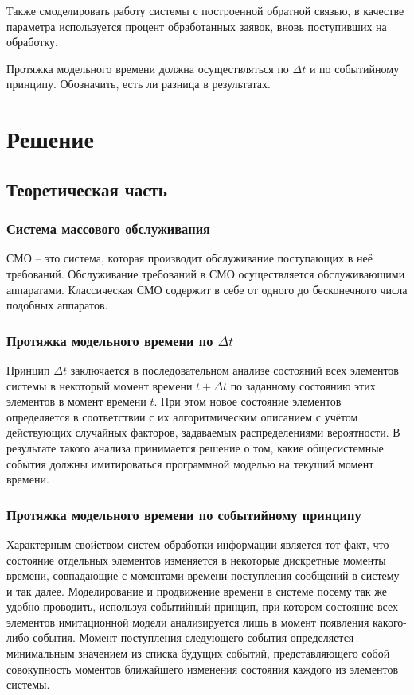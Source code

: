 \documentclass[14pt]{extreport}
\begin{document}
Также смоделировать работу системы с построенной обратной связью, в качестве параметра используется процент обработанных заявок, вновь поступивших на обработку.

Протяжка модельного времени должна осуществляться по $\Delta t$ и по событийному принципу. Обозначить, есть ли разница в результатах. 



\chapter{Решение}
\section{Теоретическая часть}

\subsection{Система массового обслуживания}

СМО -- это система, которая производит обслуживание поступающих в неё требований. Обслуживание требований в СМО осуществляется обслуживающими аппаратами. Классическая СМО содержит в себе от одного до бесконечного числа подобных аппаратов.

\subsection{Протяжка модельного времени по $\Delta t$}

Принцип $\Delta t$ заключается в последовательном анализе состояний всех элементов системы в некоторый момент времени $t + \Delta t$ по заданному состоянию этих элементов в момент времени $t$. При этом новое состояние элементов определяется в соответствии с их алгоритмическим описанием с учётом действующих случайных факторов, задаваемых распределениями вероятности. В результате такого анализа принимается решение о том, какие общесистемные события должны имитироваться программной моделью на текущий момент времени.

\subsection{Протяжка модельного времени по событийному принципу}

Характерным свойством систем обработки информации является тот факт, что состояние отдельных элементов изменяется в некоторые дискретные моменты времени, совпадающие с моментами времени поступления сообщений в систему и так далее. Моделирование и продвижение времени в системе посему так же удобно проводить, используя событийный принцип, при котором состояние всех элементов имитационной модели анализируется лишь в момент появления какого-либо события. Момент поступления следующего события определяется минимальным значением из списка будущих событий, представляющего собой совокупность моментов ближайшего изменения состояния каждого из элементов системы.
\end{document}
